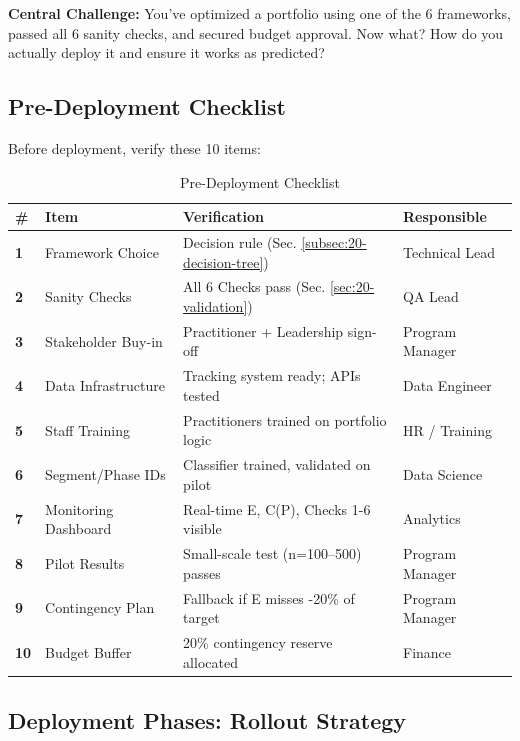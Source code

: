 \textbf{Central Challenge:} You've optimized a portfolio using one of the 6 frameworks, passed all 6 sanity checks, and secured budget approval. Now what? How do you actually deploy it and ensure it works as predicted?

\subsection{Pre-Deployment Checklist}

Before deployment, verify these 10 items:

\begin{table}[htbp]
\centering
\caption{Pre-Deployment Checklist}
\label{tab:20-deployment-checklist}
\renewcommand{\arraystretch}{1.3}
\small
\begin{tabular}{@{}llll@{}}
\toprule
\textbf{\#} & \textbf{Item} & \textbf{Verification} & \textbf{Responsible} \\
\midrule
\textbf{1} & Framework Choice & Decision rule (Sec. \ref{subsec:20-decision-tree}) & Technical Lead \\
\midrule
\textbf{2} & Sanity Checks & All 6 Checks pass (Sec. \ref{sec:20-validation}) & QA Lead \\
\midrule
\textbf{3} & Stakeholder Buy-in & Practitioner + Leadership sign-off & Program Manager \\
\midrule
\textbf{4} & Data Infrastructure & Tracking system ready; APIs tested & Data Engineer \\
\midrule
\textbf{5} & Staff Training & Practitioners trained on portfolio logic & HR / Training \\
\midrule
\textbf{6} & Segment/Phase IDs & Classifier trained, validated on pilot & Data Science \\
\midrule
\textbf{7} & Monitoring Dashboard & Real-time E, C(P), Checks 1-6 visible & Analytics \\
\midrule
\textbf{8} & Pilot Results & Small-scale test (n=100--500) passes & Program Manager \\
\midrule
\textbf{9} & Contingency Plan & Fallback if E misses -20\% of target & Program Manager \\
\midrule
\textbf{10} & Budget Buffer & 20\% contingency reserve allocated & Finance \\
\bottomrule
\end{tabular}
\end{table}

\subsection{Deployment Phases: Rollout Strategy}

